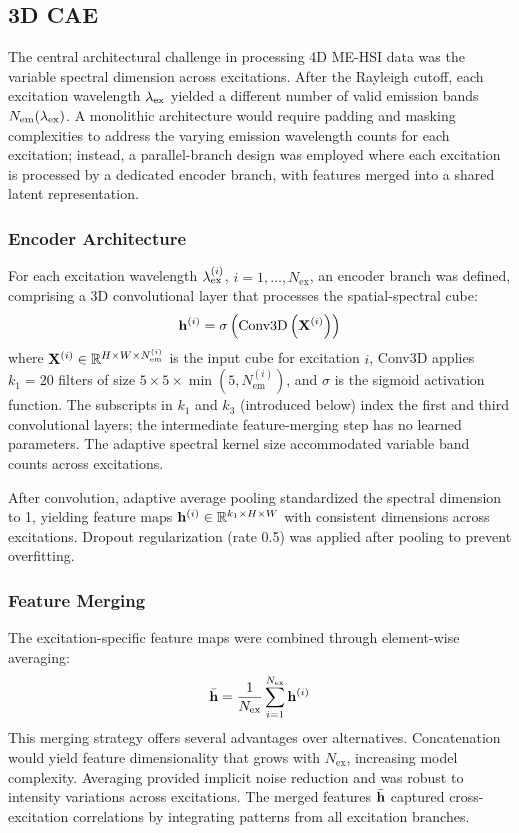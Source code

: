\subsection{3D CAE}
\label{sec:architecture}

The central architectural challenge in processing 4D ME-HSI data was the variable spectral dimension across excitations.
After the Rayleigh cutoff, each excitation wavelength $\lambda_{\text{ex}}$ yielded a different number of valid emission bands $N_{\text{em}}(\lambda_{\text{ex}})$.
A monolithic architecture would require padding and masking complexities to address the varying emission wavelength counts for each excitation; instead, a parallel-branch design was employed where each excitation is processed by a dedicated encoder branch, with features merged into a shared latent representation.

\subsubsection{Encoder Architecture}
For each excitation wavelength $\lambda_{\text{ex}}^{(i)}$, $i = 1, \ldots, N_{\text{ex}}$, an encoder branch was defined, comprising a 3D convolutional layer that processes the spatial-spectral cube:
\begin{equation}
\mathbf{h}^{(i)} = \sigma\left(\text{Conv3D}\left(\mathbf{X}^{(i)}\right)\right)
\label{eq:encoder}
\end{equation}
where $\mathbf{X}^{(i)} \in \mathbb{R}^{H \times W \times N_{\text{em}}^{(i)}}$ is the input cube for excitation $i$, Conv3D applies $k_1 = 20$ filters of size $5 \times 5 \times \min(5, N_{\text{em}}^{(i)})$, and $\sigma$ is the sigmoid activation function.
The subscripts in $k_1$ and $k_3$ (introduced below) index the first and third convolutional layers; the intermediate feature-merging step has no learned parameters.
The adaptive spectral kernel size accommodated variable band counts across excitations.

After convolution, adaptive average pooling standardized the spectral dimension to 1, yielding feature maps $\mathbf{h}^{(i)} \in \mathbb{R}^{k_1 \times H \times W}$ with consistent dimensions across excitations.
Dropout regularization (rate 0.5) was applied after pooling to prevent overfitting.

\subsubsection{Feature Merging}
The excitation-specific feature maps were combined through element-wise averaging:
\begin{equation}
\bar{\mathbf{h}} = \frac{1}{N_{\text{ex}}} \sum_{i=1}^{N_{\text{ex}}} \mathbf{h}^{(i)}
\label{eq:merge}
\end{equation}
This merging strategy offers several advantages over alternatives.
Concatenation would yield feature dimensionality that grows with $N_{\text{ex}}$, increasing model complexity.
Averaging provided implicit noise reduction and was robust to intensity variations across excitations.
The merged features $\bar{\mathbf{h}}$ captured cross-excitation correlations by integrating patterns from all excitation branches.

